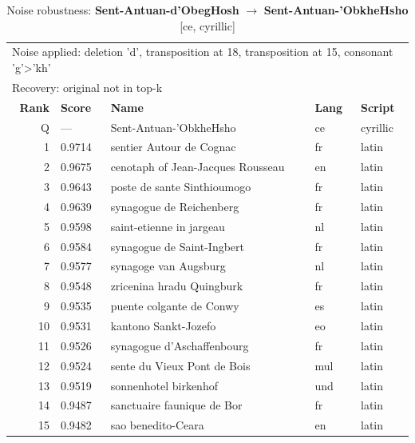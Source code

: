 \begin{table}[htbp]
\centering
\small
\caption{Noise robustness: \textbf{Sent-Antuan-d'ObegHosh} $\rightarrow$ \textbf{Sent-Antuan-'ObkheHsho} [ce, cyrillic]}
\label{tab:noise-19}
\begin{tabular}{rllll}
\toprule
\multicolumn{5}{l}{\small Noise applied: deletion 'd', transposition at 18, transposition at 15, consonant 'g'>'kh'} \\
\multicolumn{5}{l}{\small Recovery: original not in top-k} \\
\midrule
\textbf{Rank} & \textbf{Score} & \textbf{Name} & \textbf{Lang} & \textbf{Script} \\
\midrule
\rowcolor{gray!20} Q & --- & Sent-Antuan-'ObkheHsho & ce & cyrillic \\
\midrule
1 & 0.9714 & sentier Autour de Cognac & fr & latin \\
2 & 0.9675 & cenotaph of Jean-Jacques Rousseau & en & latin \\
3 & 0.9643 & poste de sante Sinthioumogo & fr & latin \\
4 & 0.9639 & synagogue de Reichenberg & fr & latin \\
5 & 0.9598 & saint-etienne in jargeau & nl & latin \\
6 & 0.9584 & synagogue de Saint-Ingbert & fr & latin \\
7 & 0.9577 & synagoge van Augsburg & nl & latin \\
8 & 0.9548 & zricenina hradu Quingburk & fr & latin \\
9 & 0.9535 & puente colgante de Conwy & es & latin \\
10 & 0.9531 & kantono Sankt-Jozefo & eo & latin \\
11 & 0.9526 & synagogue d'Aschaffenbourg & fr & latin \\
12 & 0.9524 & sente du Vieux Pont de Bois & mul & latin \\
13 & 0.9519 & sonnenhotel birkenhof & und & latin \\
14 & 0.9487 & sanctuaire faunique de Bor & fr & latin \\
15 & 0.9482 & sao benedito-Ceara & en & latin \\
\bottomrule
\end{tabular}
\end{table}

